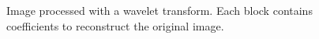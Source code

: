 \documentclass[12pt]{article}
\begin{document}
\begin{figure}[!htbp]
\begin{center}
\caption{Image processed with a wavelet transform. Each block contains coefficients to reconstruct the original image.}
\end{center}
\end{figure}
\end{document}
